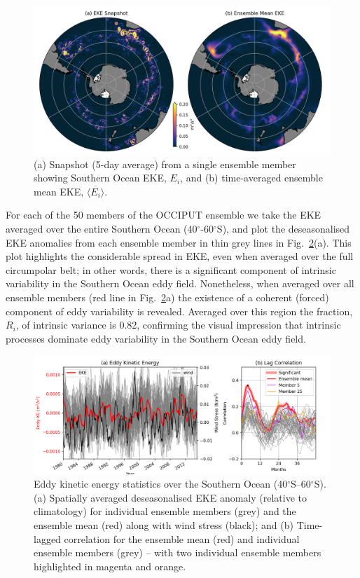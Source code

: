 \documentclass{agujournal2019}
\begin{document}
\begin{figure}[ht]
\begin{center}
\includegraphics[width=\hsize]{Figure1}
\caption{(a) Snapshot (5-day average) from a single ensemble member showing Southern Ocean EKE, $E_i$, and (b) time-averaged ensemble mean EKE, $\overline{\langle E_i\rangle}$.}
\label{Fig:1}
\end{center}
\end{figure}

For each of the 50 members of the OCCIPUT ensemble we take the EKE averaged over the entire Southern Ocean (40$^\circ$-60$^\circ$S), and plot the deseasonalised EKE anomalies from each ensemble member in thin grey lines in Fig.~\ref{Fig:2}(a). 
This plot highlights the considerable spread in EKE, even when averaged over the full circumpolar belt; in other words, there is a significant component of intrinsic variability in the Southern Ocean eddy field.
Nonetheless, when averaged over all ensemble members (red line in Fig.~\ref{Fig:2}a) the existence of a coherent (forced) component of eddy variability is revealed.
Averaged over this region the fraction, $R_i$, of intrinsic variance is 0.82, confirming the visual impression that intrinsic processes dominate eddy variability in the Southern Ocean eddy field.

\begin{figure}[t]
\begin{center}
\includegraphics[width=\hsize]{Figure2}
\caption{Eddy kinetic energy statistics over the Southern Ocean (40$^\circ$S--60$^\circ$S). (a) Spatially averaged deseasonalised EKE anomaly (relative to climatology) for individual ensemble members (grey) and the ensemble mean (red) along with wind stress (black); and (b) Time-lagged correlation for the ensemble mean (red) and individual ensemble  members (grey) -- with two individual ensemble members highlighted in magenta and orange.}
\label{Fig:2}
\end{center}
\end{figure}
\end{document}
